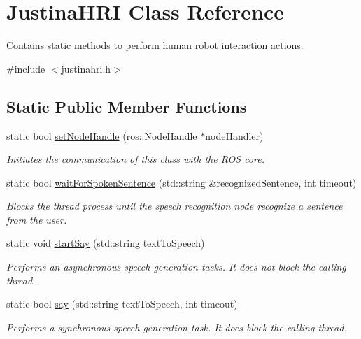\hypertarget{class_justina_h_r_i}{}\section{Justina\+H\+RI Class Reference}
\label{class_justina_h_r_i}


Contains static methods to perform human robot interaction actions.  




{\ttfamily \#include $<$justinahri.\+h$>$}

\subsection*{Static Public Member Functions}
\begin{DoxyCompactItemize}
\item 
static bool \hyperlink{class_justina_h_r_i_a5fa534777896e61633e48eb29504d378}{set\+Node\+Handle} (ros\+::\+Node\+Handle $\ast$node\+Handler)
\begin{DoxyCompactList}\small\item\em Initiates the communication of this class with the R\+OS core. \end{DoxyCompactList}\item 
static bool \hyperlink{class_justina_h_r_i_a0eeb1f4e8fd2196f1781c55d57321c90}{wait\+For\+Spoken\+Sentence} (std\+::string \&recognized\+Sentence, int timeout)
\begin{DoxyCompactList}\small\item\em Blocks the thread process until the speech recognition node recognize a sentence from the user. \end{DoxyCompactList}\item 
static void \hyperlink{class_justina_h_r_i_a4cbe68af9d79bb9e025be2adaf2bd89d}{start\+Say} (std\+::string text\+To\+Speech)
\begin{DoxyCompactList}\small\item\em Performs an asynchronous speech generation tasks. It does not block the calling thread. \end{DoxyCompactList}\item 
static bool \hyperlink{class_justina_h_r_i_af8e36ff5c4c0e7a18db3c75826d1741c}{say} (std\+::string text\+To\+Speech, int timeout)
\begin{DoxyCompactList}\small\item\em Performs a synchronous speech generation task. It does block the calling thread. \end{DoxyCompactList}\item 

\end{DoxyCompactItemize}

